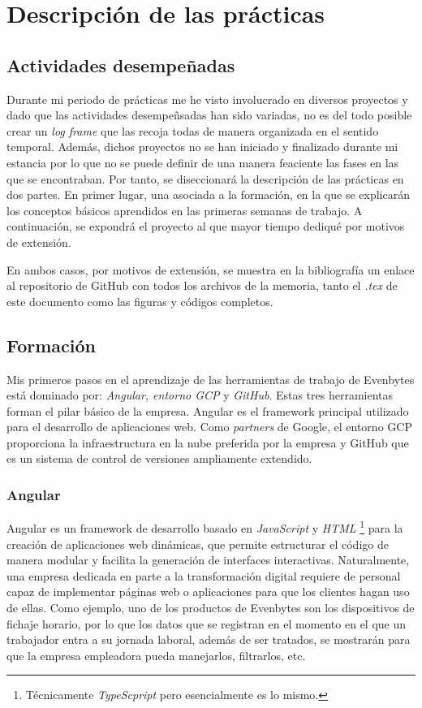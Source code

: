 \chapter{Descripción de las prácticas} \label{descripcion de las practicas}
%
%
\section{Actividades desempeñadas} \label{Actividades desempeñadas}
%
Durante mi periodo de prácticas me he visto involucrado en diversos proyectos y dado que las actividades desempeñsadas han sido variadas, no es del todo posible crear un \textit{log frame} que las recoja todas de manera organizada en el sentido temporal. Además, dichos proyectos no se han iniciado y finalizado durante mi estancia por lo que no se puede definir de una manera feaciente las fases en las que se encontraban. Por tanto, se diseccionará la descripción de las prácticas en dos partes. En primer lugar, una asociada a la formación, en la que se explicarán los conceptos básicos aprendidos en las primeras semanas de trabajo. A continuación, se expondrá el proyecto al que mayor tiempo dediqué por motivos de extensión.

En ambos casos, por motivos de extensión, se muestra en la bibliografía un enlace al repositorio de GitHub \cite{AlcamsodMemoria} con todos los archivos de la memoria, tanto el \textit{.tex} de este documento como las figuras y códigos completos.
%
%
\section{Formación}
%
%
Mis primeros pasos en el aprendizaje de las herramientas de trabajo de Evenbytes está dominado por: \textit{Angular, entorno GCP} y \textit{GitHub}. Estas tres herramientas forman el pilar básico de la empresa. Angular es el framework principal utilizado para el desarrollo de aplicaciones web. Como \textit{partners} de Google, el entorno GCP proporciona la infraestructura en la nube preferida por la empresa y GitHub que es un sistema de control de versiones ampliamente extendido.
%
%
\subsection{Angular}
%
%
Angular es un framework de desarrollo basado en \textit{JavaScript} y \textit{HTML} \footnote{Técnicamente \textit{TypeScpript} pero esencialmente es lo mismo.} para la creación de aplicaciones web dinámicas, que permite estructurar el código de manera modular y facilita la generación de interfaces interactivas. Naturalmente, una empresa dedicada en parte a la transformación digital requiere de personal capaz de implementar páginas web o aplicaciones para que los clientes hagan uso de ellas. Como ejemplo, uno de los productos de Evenbytes son los dispositivos de fichaje horario, por lo que los datos que se registran en el momento en el que un trabajador entra a su jornada laboral, además de ser tratados, se mostrarán para que la empresa empleadora pueda manejarlos, filtrarlos, etc.

